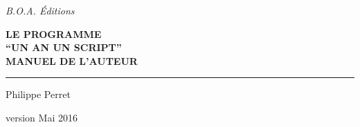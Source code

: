 
\begin{titlepage}
	\begin{center}\LARGE
		\textit{B.O.A. Éditions}
	\end{center}
	\selectfont

	\begin{flushleft}\huge\bfseries
    LE PROGRAMME \\
    \enquote{UN AN UN SCRIPT} \\
		{\small MANUEL DE L'AUTEUR}
	\end{flushleft}

	\hrule

	\begin{flushright}
		Philippe Perret
	\end{flushright}

	\begin{flushleft}\itshape\small
	\end{flushleft}

	\begin{center}
    version Mai 2016
	\end{center}
\end{titlepage}

